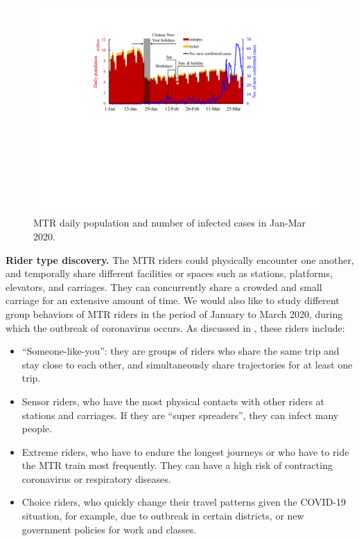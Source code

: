 \documentclass[11pt]{article}
\begin{document}
\begin{figure}[!hbt]
\centering
\includegraphics[width=0.6\columnwidth,page=1]{submissions/reynold/figs/MTR-trend.pdf}
\caption{MTR daily population and number of infected cases in Jan-Mar 2020.}
\label{fig:MTR-trend}
\end{figure}


{\bf Rider type discovery.} The MTR riders could physically encounter one another, and temporally share different facilities or spaces such as stations, platforms, elevators, and carriages. They can concurrently share a crowded and small carriage for an extensive amount of time. We would also like to study different group behaviors of MTR riders in the period of January to March 2020, during which the outbreak of coronavirus occurs. As discussed in \cite{zhou2020familiar}, these riders include:

\begin{itemize}
	\item ``Someone-like-you'': they are groups of riders who share the same trip and stay close to each other, and simultaneously share trajectories for at least one trip. 
	
	\item Sensor riders, who have the most physical contacts with other riders at stations and carriages. If they are ``super spreaders'', they can infect many people. 

	\item Extreme riders, who have to endure the longest journeys or who have to ride the MTR train most frequently. They can have a high risk of contracting coronavirus or respiratory diseases.

	\item Choice riders, who quickly change their travel patterns given the COVID-19 situation, for example, due to outbreak in certain districts, or new government policies for work and classes. 

\end{itemize}
\end{document}
